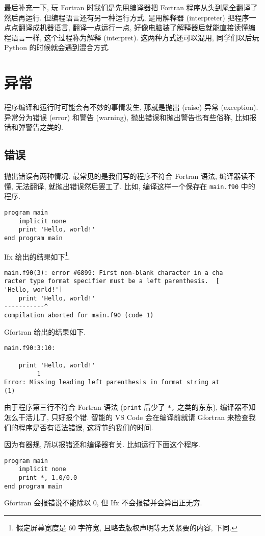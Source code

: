 最后补充一下, 玩 Fortran 时我们是先用编译器把 Fortran 程序从头到尾全翻译了然后再运行. 但编程语言还有另一种运行方式, 是用解释器 (interpreter) 把程序一点点翻译成机器语言, 翻译一点运行一点, 好像电脑装了解释器后就能直接读懂编程语言一样, 这个过程称为解释 (interpret). 这两种方式还可以混用, 同学们以后玩 Python 的时候就会遇到混合方式.

\section{异常}\label{fortran_exception}

程序编译和运行时可能会有不妙的事情发生, 那就是抛出 (raise) 异常 (exception). 异常分为错误 (error) 和警告 (warning), 抛出错误和抛出警告也有些俗称, 比如报错和弹警告之类的.

\subsection{错误}\label{fortran_error}

抛出错误有两种情况. 最常见的是我们写的程序不符合 Fortran 语法, 编译器读不懂, 无法翻译, 就抛出错误然后罢工了. 比如, 编译这样一个保存在 \texttt{main.f90} 中的程序.
\begin{lstlisting}
program main
    implicit none
    print 'Hello, world!'
end program main
\end{lstlisting}
Ifx 给出的结果如下\footnote{
    假定屏幕宽度是 60 字符宽, 且略去版权声明等无关紧要的内容, 下同.
}.
\begin{verbatim}
main.f90(3): error #6899: First non-blank character in a cha
racter type format specifier must be a left parenthesis.  [
'Hello, world!']
    print 'Hello, world!'
-----------^
compilation aborted for main.f90 (code 1)
\end{verbatim}
Gfortran 给出的结果如下.
\begin{verbatim}
main.f90:3:10:

    print 'Hello, world!'
         1
Error: Missing leading left parenthesis in format string at 
(1)
\end{verbatim}
由于程序第三行不符合 Fortran 语法 (\texttt{print} 后少了 \texttt{*,} 之类的东东), 编译器不知怎么干活儿了, 只好报个错. 智能的 VS Code 会在编译前就请 Gfortran 来检查我们的程序是否有语法错误, 这将节约我们的时间.

因为有器规, 所以报错还和编译器有关. 比如运行下面这个程序.
\begin{lstlisting}
program main
    implicit none
    print *, 1.0/0.0
end program main
\end{lstlisting}
Gfortran 会报错说不能除以 $0$, 但 Ifx 不会报错并会算出正无穷.

